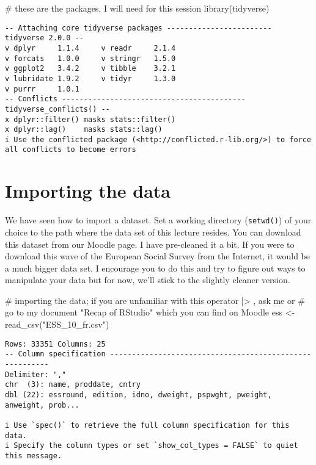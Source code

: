 \documentclass[
  letterpaper,
  DIV=11,
  numbers=noendperiod]{scrreprt}
\newenvironment{Shaded}{\begin{snugshade}}{\end{snugshade}}
\newcommand{\CommentTok}[1]{\textcolor[rgb]{0.37,0.37,0.37}{#1}}
\newcommand{\FunctionTok}[1]{\textcolor[rgb]{0.28,0.35,0.67}{#1}}
\newcommand{\NormalTok}[1]{\textcolor[rgb]{0.00,0.23,0.31}{#1}}
\newcommand{\OtherTok}[1]{\textcolor[rgb]{0.00,0.23,0.31}{#1}}
\newcommand{\StringTok}[1]{\textcolor[rgb]{0.13,0.47,0.30}{#1}}
\begin{document}
\begin{Shaded}
\begin{Highlighting}[]
\CommentTok{\# these are the packages, I will need for this session}
\FunctionTok{library}\NormalTok{(tidyverse)}
\end{Highlighting}
\end{Shaded}

\begin{verbatim}
-- Attaching core tidyverse packages ------------------------ tidyverse 2.0.0 --
v dplyr     1.1.4     v readr     2.1.4
v forcats   1.0.0     v stringr   1.5.0
v ggplot2   3.4.2     v tibble    3.2.1
v lubridate 1.9.2     v tidyr     1.3.0
v purrr     1.0.1     
-- Conflicts ------------------------------------------ tidyverse_conflicts() --
x dplyr::filter() masks stats::filter()
x dplyr::lag()    masks stats::lag()
i Use the conflicted package (<http://conflicted.r-lib.org/>) to force all conflicts to become errors
\end{verbatim}

\hypertarget{importing-the-data}{%
\section{Importing the data}\label{importing-the-data}}

We have seen how to import a dataset. Set a working directory
(\texttt{setwd()}) of your choice to the path where the data set of this
lecture resides. You can download this dataset from our Moodle page. I
have pre-cleaned it a bit. If you were to download this wave of the
European Social Survey from the Internet, it would be a much bigger data
set. I encourage you to do this and try to figure out ways to manipulate
your data but for now, we'll stick to the slightly cleaner version.

\begin{Shaded}
\begin{Highlighting}[]
\CommentTok{\# importing the data; if you are unfamiliar with this operator |\textgreater{} , ask me or}
\CommentTok{\# go to my document "Recap of RStudio" which you can find on Moodle}
\NormalTok{ess }\OtherTok{\textless{}{-}} \FunctionTok{read\_csv}\NormalTok{(}\StringTok{"ESS\_10\_fr.csv"}\NormalTok{)}
\end{Highlighting}
\end{Shaded}

\begin{verbatim}
Rows: 33351 Columns: 25
-- Column specification --------------------------------------------------------
Delimiter: ","
chr  (3): name, proddate, cntry
dbl (22): essround, edition, idno, dweight, pspwght, pweight, anweight, prob...

i Use `spec()` to retrieve the full column specification for this data.
i Specify the column types or set `show_col_types = FALSE` to quiet this message.
\end{verbatim}
\end{document}
